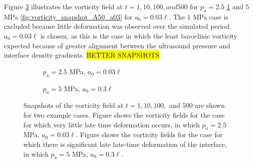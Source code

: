 Figure \ref{fig:us_vorticity_snapshots} illustrates the vorticity
field at $t=1, 10, 100, and 500$ for $p_a = 2.5$
\ref{fig:vorticity_snapshot_A25_a03} and $5$ MPa
\ref{fig:vorticity_snapshot_A50_a03} for $a_0 = 0.03\ell$. The $1$ MPa
case is excluded because little deformation was observed over the
simulated period. $a_0 = 0.03\ell$ is chosen, as this is the case in
which the least baroclinic vorticity expected because of greater
alignment between the ultrasound pressure and interface density
gradients. 
%
\hl{BETTER SNAPSHOTS}
\begin{figure}
  \centering
  \begin{subfigure}[b]{0.9\textwidth}
    \caption{\label{fig:vorticity_snapshot_A25_a03} $p_a = 2.5$ MPa, $a_0 = 0.03\ell$}
  \end{subfigure}
  \begin{subfigure}[b]{0.9\textwidth}
    \caption{\label{fig:vorticity_snapshot_A50_a30} $p_a = 5$ MPa, $a_0 = 0.3\ell$}
  \end{subfigure}
  \caption{Snapshots of the vorticity field at $t=1, 10, 100,$ and
    $500$ are shown for two example cases. Figure
     shows the vorticity
    fields for the case for which very little late time deformation
    occurs, in which $p_a = 2.5$ MPa, $a_0 = 0.03\ell$. Figure
     shows the vorticity
    fields for the case for which there is significant late late-time
    deformation of the interface, in which $p_a = 5$ MPa,
    $a_0 = 0.3\ell$.}
  \label{fig:us_vorticity_snapshots}
\end{figure}

